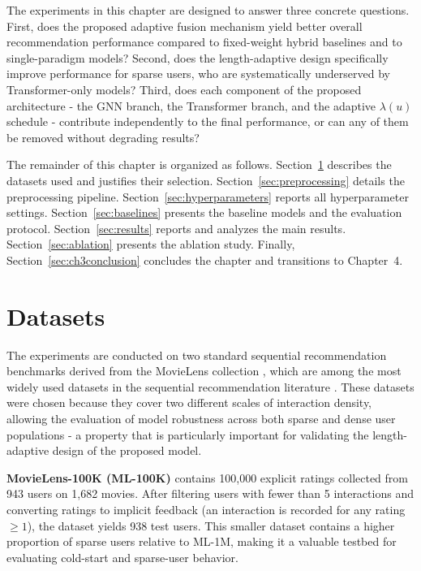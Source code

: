 \documentclass[12pt,a4paper]{report}
\begin{document}
The experiments in this chapter are designed to answer three concrete
questions. First, does the proposed adaptive fusion mechanism yield better
overall recommendation performance compared to fixed-weight hybrid baselines
and to single-paradigm models? Second, does the length-adaptive design
specifically improve performance for sparse users, who are systematically
underserved by Transformer-only models? Third, does each component of the
proposed architecture - the GNN branch, the Transformer branch, and the
adaptive \(\lambda(u)\) schedule - contribute independently to the final
performance, or can any of them be removed without degrading results?

The remainder of this chapter is organized as follows.
Section~\ref{sec:datasets} describes the datasets used and justifies their
selection. Section~\ref{sec:preprocessing} details the preprocessing pipeline.
Section~\ref{sec:hyperparameters} reports all hyperparameter settings.
Section~\ref{sec:baselines} presents the baseline models and the evaluation
protocol. Section~\ref{sec:results} reports and analyzes the main results.
Section~\ref{sec:ablation} presents the ablation study. Finally,
Section~\ref{sec:ch3conclusion} concludes the chapter and transitions to
Chapter~4.

\section{Datasets}
\label{sec:datasets}

The experiments are conducted on two standard sequential recommendation
benchmarks derived from the MovieLens collection \citep{harper2015movielens},
which are among the most widely used datasets in the sequential recommendation
literature \citep{pan2024survey, kang2018sasrec, sun2019bert4rec}. These
datasets were chosen because they cover two different scales of interaction
density, allowing the evaluation of model robustness across both sparse and
dense user populations - a property that is particularly important for
validating the length-adaptive design of the proposed model.

\textbf{MovieLens-100K (ML-100K)} contains 100,000 explicit ratings collected
from 943 users on 1,682 movies. After filtering users with fewer than 5
interactions and converting ratings to implicit feedback (an interaction is
recorded for any rating \(\geq 1\)), the dataset yields 938 test users. This
smaller dataset contains a higher proportion of sparse users relative to
ML-1M, making it a valuable testbed for evaluating cold-start and sparse-user
behavior.
\end{document}
